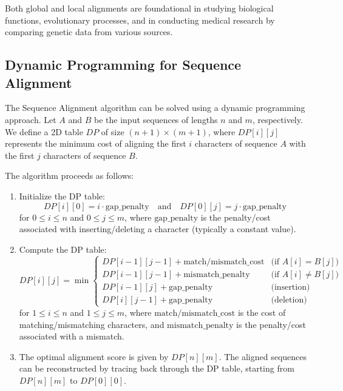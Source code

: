 \documentclass[12pt]{book} %
\begin{document}
Both global and local alignments are foundational in studying biological functions, evolutionary processes, and in conducting medical research by comparing genetic data from various sources.



\subsection{Dynamic Programming for Sequence Alignment}
The Sequence Alignment algorithm can be solved using a dynamic programming approach. Let \( A \) and \( B \) be the input sequences of lengths \( n \) and \( m \), respectively. We define a 2D table \( DP \) of size \( (n+1) \times (m+1) \), where \( DP[i][j] \) represents the minimum cost of aligning the first \( i \) characters of sequence \( A \) with the first \( j \) characters of sequence \( B \).

The algorithm proceeds as follows:

\begin{enumerate}
    \item Initialize the DP table:
    \[
    DP[i][0] = i \cdot \text{gap\_penalty} \quad \text{and} \quad DP[0][j] = j \cdot \text{gap\_penalty}
    \]
    for \( 0 \leq i \leq n \) and \( 0 \leq j \leq m \), where \( \text{gap\_penalty} \) is the penalty/cost associated with inserting/deleting a character (typically a constant value).
    
    \item Compute the DP table:
    \[
    DP[i][j] = \min \begin{cases}
        DP[i-1][j-1] + \text{match/mismatch\_cost} & \text{(if } A[i] = B[j]) \\
        DP[i-1][j-1] + \text{mismatch\_penalty} & \text{(if } A[i] \neq B[j]) \\
        DP[i-1][j] + \text{gap\_penalty} & \text{(insertion)} \\
        DP[i][j-1] + \text{gap\_penalty} & \text{(deletion)}
    \end{cases}
    \]
    for \( 1 \leq i \leq n \) and \( 1 \leq j \leq m \), where \( \text{match/mismatch\_cost} \) is the cost of matching/mismatching characters, and \( \text{mismatch\_penalty} \) is the penalty/cost associated with a mismatch.
    
    \item The optimal alignment score is given by \( DP[n][m] \). The aligned sequences can be reconstructed by tracing back through the DP table, starting from \( DP[n][m] \) to \( DP[0][0] \).
\end{enumerate}
\end{document}
